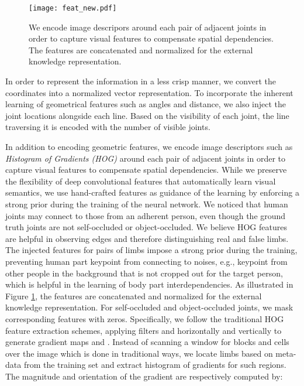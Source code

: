 \documentclass[journal ]{IEEEtran}
\begin{document}
\begin{figure}[t]
	\begin{center}
		\texttt{[image: feat\_new.pdf]}
	\end{center}
	\caption{We encode image descripors around each pair of adjacent joints in order to capture visual features to compensate spatial dependencies. The features are concatenated and normalized for the external knowledge representation.}
	\label{fig:feat}
\end{figure}

In order to represent the information in a less crisp manner, we convert the coordinates into a normalized vector representation. To incorporate the inherent learning of geometrical features such as angles and distance, we also inject the joint locations alongside each line. Based on the visibility of each joint, the line traversing it is encoded with the number of visible joints.

In addition to encoding geometric features, we encode image descriptors such as \textit{Histogram of Gradients (HOG)} \cite{dalal2005histograms} around each pair of adjacent joints in order to capture visual features to compensate spatial dependencies. 
While we preserve the flexibility of deep convolutional features that automatically learn visual semantics, we use hand-crafted features as guidance of the learning by enforcing a strong prior during the training of the neural network. We noticed that human joints may connect to those from an adherent person, even though the ground truth joints are not self-occluded or object-occluded. We believe HOG features are helpful in observing edges and therefore distinguishing real and false limbs.
The injected features for pairs of limbs impose a strong prior during the training, preventing human part keypoint from connecting to noises, e.g., keypoint from other people in the background that is not cropped out for the target person, which is helpful in the learning of body part interdependencies. 
As illustrated in Figure \ref{fig:feat}, the features are concatenated and normalized for the external knowledge representation. For self-occluded and object-occluded joints, we mask corresponding features with zeros.
Specifically, we follow the traditional HOG feature extraction schemes, applying filters  and  horizontally and vertically to generate gradient maps  and . Instead of scanning a window for blocks and cells over the image which is done in traditional ways, we locate limbs based on meta-data from the training set and extract histogram of gradients for such regions. 
The magnitude and orientation of the gradient are respectively computed by:
\end{document}
